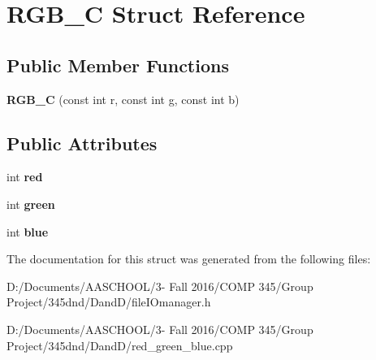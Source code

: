 \hypertarget{struct_r_g_b___c}{}\section{R\+G\+B\+\_\+C Struct Reference}
\label{struct_r_g_b___c}
\subsection*{Public Member Functions}
\begin{DoxyCompactItemize}
\item 
\hypertarget{struct_r_g_b___c_a16c521720fd720b4e6acc1342dc90a45}{}\label{struct_r_g_b___c_a16c521720fd720b4e6acc1342dc90a45} 
{\bfseries R\+G\+B\+\_\+C} (const int r, const int g, const int b)
\end{DoxyCompactItemize}
\subsection*{Public Attributes}
\begin{DoxyCompactItemize}
\item 
\hypertarget{struct_r_g_b___c_a1645fa3888d6fc44a7b2b020e2e77e64}{}\label{struct_r_g_b___c_a1645fa3888d6fc44a7b2b020e2e77e64} 
int {\bfseries red}
\item 
\hypertarget{struct_r_g_b___c_aeef3d1ade2a3186a4f0946aeb3a5a0d5}{}\label{struct_r_g_b___c_aeef3d1ade2a3186a4f0946aeb3a5a0d5} 
int {\bfseries green}
\item 
\hypertarget{struct_r_g_b___c_a1d9f5acccd1f07b2616e5b18101b50f2}{}\label{struct_r_g_b___c_a1d9f5acccd1f07b2616e5b18101b50f2} 
int {\bfseries blue}
\end{DoxyCompactItemize}


The documentation for this struct was generated from the following files\+:\begin{DoxyCompactItemize}
\item 
D\+:/\+Documents/\+A\+A\+S\+C\+H\+O\+O\+L/3-\/ Fall 2016/\+C\+O\+M\+P 345/\+Group Project/345dnd/\+Dand\+D/file\+I\+Omanager.\+h\item 
D\+:/\+Documents/\+A\+A\+S\+C\+H\+O\+O\+L/3-\/ Fall 2016/\+C\+O\+M\+P 345/\+Group Project/345dnd/\+Dand\+D/red\+\_\+green\+\_\+blue.\+cpp\end{DoxyCompactItemize}
